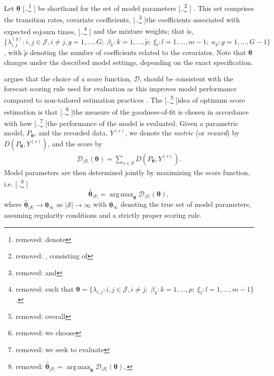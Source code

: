 \documentclass{article}
\DeclareMathOperator*{\argmax}{arg\,max}
\providecommand{\DIFadd}[1]{{\protect\color{blue} \sf #1}} %
\providecommand{\DIFdel}[1]{{\protect\color{red} [..\footnote{removed: #1} ]}} %
\providecommand{\DIFaddbegin}{} %
\providecommand{\DIFaddend}{} %
\providecommand{\DIFdelbegin}{} %
\providecommand{\DIFdelend}{} %
\begin{document}
Let $\bm{\theta}$ \DIFdelbegin \DIFdel{denote }\DIFdelend \DIFaddbegin \DIFadd{be shorthand for }\DIFaddend the set of model parameters\DIFdelbegin \DIFdel{, consisting of }\DIFdelend \DIFaddbegin \DIFadd{. This set comprises }\DIFaddend the transition rates, covariate coefficients, \DIFdelbegin \DIFdel{and }\DIFdelend the coefficients associated with expected sojourn times, \DIFdelbegin \DIFdel{such that $\bm{\theta} = \{ \lambda_{i,j} : i,j \in \mathcal{J}, i \neq j ; \; \beta_k : k = 1,\dots, p ; \; \xi_l : l = 1, \dots, m-1\} $. }\DIFdelend \DIFaddbegin \DIFadd{and the mixture weights; that is, $\{ \lambda_{i,j}^{(g)} : i,j \in \mathcal{J}, i \neq j, g=1,\dots,G ; \; \beta_k : k = 1,\dots, \widetilde{p} ; \; \xi_l : l = 1, \dots, m-1 ;  \; \kappa_g : g=1,\dots,G-1\} $, with $\widetilde{p}$ denoting the number of coefficients related to the covariates. Note that $\bm{\theta}$ changes under the described model settings, depending on the exact specification.
}\DIFaddend %
\DIFaddbegin 

\DIFaddend \citet{Gneiting2007} argues that the choice of a score function, $\mathcal{D}$, should be consistent with the forecast scoring rule used for evaluation as this improves model performance compared to non-tailored estimation practices \citep{friedman1983a,Copas1983}. 
The \DIFdelbegin \DIFdel{overall }\DIFdelend idea of optimum score estimation is that \DIFdelbegin \DIFdel{we choose }\DIFdelend the measure of the goodness-of-fit \DIFaddbegin \DIFadd{is chosen }\DIFaddend in accordance with how \DIFdelbegin \DIFdel{we seek to evaluate }\DIFdelend the performance of the model \DIFaddbegin \DIFadd{is evaluated}\DIFaddend . 
Given a parametric model, $P_{\bm{\theta}}$, and the recorded data, $Y^{(s)}$, we denote the \textit{metric} (or \textit{reward}) by $D(P_{\bm{\theta}}, Y^{(s)})$, and the score by
\begin{align}
    \mathcal{D}_{|\mathcal{S}|}(\bm{\theta}) = \sum_{s \in \mathcal{S}} D\left(P_{\bm{\theta}}, Y^{(s)}\right). %
    \label{eq:mean_score}
\end{align}
Model parameters are then determined \DIFaddbegin \DIFadd{jointly }\DIFaddend by maximizing the score function, i.e.
\DIFdelbegin \DIFdel{$\widehat{\bm{\theta}}_{|\mathcal{S}|} = \argmax_{\bm{\theta}}\mathcal{D}_{|\mathcal{S}|}(\bm{\theta}), $
}\DIFdelend \DIFaddbegin $$\widehat{\bm{\theta}}_{|\mathcal{S}|} = \argmax_{\bm{\theta}}\mathcal{D}_{|\mathcal{S}|}(\bm{\theta}), $$
\DIFaddend where $\widehat{\bm{\theta}}_{|\mathcal{S}|}  \rightarrow \bm{\theta}_{\infty}$ as $|\mathcal{S}| \rightarrow \infty$ with $\bm{\theta}_{\infty}$ denoting the true set of model parameters, assuming regularity conditions and a strictly proper scoring rule.
\end{document}
